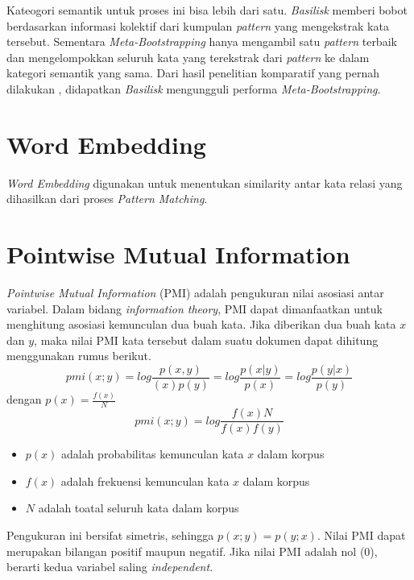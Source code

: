 Kateogori semantik untuk proses ini bisa lebih dari satu. \textit{Basilisk} memberi bobot berdasarkan informasi kolektif dari kumpulan \textit{pattern} yang mengekstrak kata tersebut. Sementara \textit{Meta-Bootstrapping} hanya mengambil satu \textit{pattern} terbaik dan mengelompokkan seluruh kata yang terekstrak dari \textit{pattern} ke dalam kategori semantik yang sama. Dari hasil penelitian komparatif yang pernah dilakukan \citep{riloff2003learning}, didapatkan \textit{Basilisk} mengungguli performa \textit{Meta-Bootstrapping}. 

\section{Word Embedding}
\textit{Word Embedding} digunakan untuk menentukan similarity antar kata relasi yang dihasilkan dari proses \textit{Pattern Matching}.

\section{Pointwise Mutual Information}
\textit{Pointwise Mutual Information} (PMI) adalah pengukuran nilai asosiasi antar variabel. Dalam bidang \textit{information theory}, PMI dapat dimanfaatkan untuk menghitung asosiasi kemunculan dua buah kata. Jika diberikan dua buah kata $x$ dan $y$, maka nilai PMI kata tersebut dalam suatu dokumen dapat dihitung menggunakan rumus berikut. 
\[ pmi(x;y)=log\frac{p(x,y)}{(x)p(y)}=log\frac{p(x|y)}{p(x)}=log\frac{p(y|x)}{p(y)} \] dengan $p(x)=\frac{f(x)}{N}$
\[ pmi(x;y)=log\frac{f(x)N}{f(x)f(y)} \]
\begin{itemize}
  \item $p(x)$ adalah probabilitas kemunculan kata $x$ dalam korpus
  \item $f(x)$ adalah frekuensi kemunculan kata $x$ dalam korpus
  \item $N$ adalah toatal seluruh kata dalam korpus
\end{itemize}
Pengukuran ini bersifat simetris, sehingga $p(x;y)=p(y;x)$. Nilai PMI dapat merupakan bilangan positif maupun negatif. Jika nilai PMI adalah nol (0), berarti kedua variabel saling \textit{independent}.

